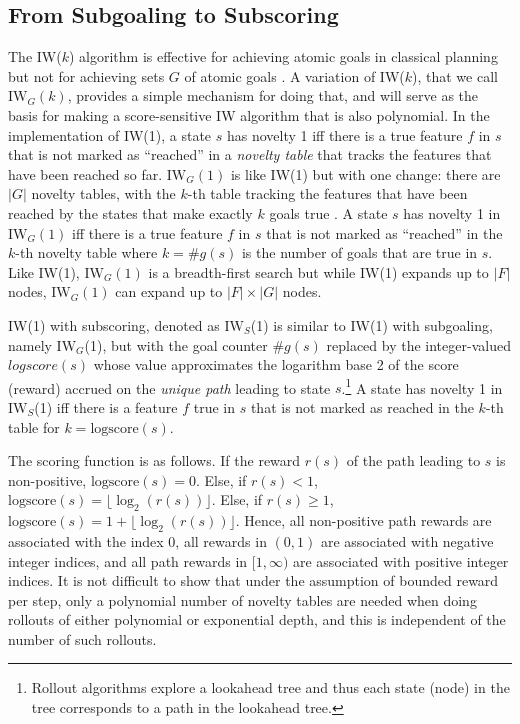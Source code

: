 \documentclass[letterpaper]{article}
\begin{document}
\subsection{From Subgoaling to Subscoring}

The IW($k$) algorithm is effective for achieving atomic goals in classical planning but
not for achieving sets $G$ of atomic goals \cite{nir:ecai2012}. A variation of IW($k$),
that we call $\textrm{IW}_G(k)$, provides a simple mechanism for doing that, and will
serve as the basis for making a score-sensitive IW algorithm that is also polynomial.
In the implementation of IW(1), a state $s$ has novelty 1 iff there is a true feature $f$
in $s$ that is not marked as ``reached''  in a \emph{novelty table} that tracks the
features that have been reached so far.
$\textrm{IW}_G(1)$ is like IW(1) but with one change: there are $|G|$ novelty tables,
with the $k$-th table tracking the features that have been reached by the states that
make exactly $k$ goals true \cite{nir:aaai2017}.
A state $s$ has novelty 1 in $\textrm{IW}_G(1)$ iff there is a true feature $f$ in $s$
that is not marked as ``reached'' in the $k$-th novelty table where  $k=\#g(s)$ is the
number of goals that are true in $s$.
Like IW(1), $\textrm{IW}_G(1)$ is a breadth-first search but while IW(1) expands up to
$|F|$ nodes,  $\textrm{IW}_G(1)$ can expand up to $|F| \times |G|$ nodes.

IW(1) with subscoring, denoted as $\textrm{IW}_S$(1) is similar to IW(1) with subgoaling,
namely $\textrm{IW}_G$(1), but with the goal counter $\#g(s)$ replaced by the integer-valued
$logscore(s)$ whose value approximates the logarithm base 2 of the score (reward) accrued
on the \emph{unique path} leading to state $s$.\footnote{Rollout algorithms explore a
  lookahead tree and thus each state (node) in the tree corresponds to a path
  in the lookahead tree.
}
A state has novelty 1 in $\textrm{IW}_S$(1) iff there is a feature $f$ true in $s$ that
is not marked as reached in the $k$-th table for $k=\text{logscore}(s)$.

The scoring function is as follows. If the reward $r(s)$ of the path leading
to $s$ is non-positive, $\text{logscore}(s)=0$.
Else, if $r(s)<1$, $\text{logscore}(s)=\lfloor\log_2(r(s))\rfloor$.
Else, if $r(s)\geq 1$, $\text{logscore}(s)=1 + \lfloor\log_2(r(s))\rfloor$.
Hence, all non-positive path rewards are associated with the index 0, all
rewards in $(0,1)$ are associated with negative integer indices, and all
path rewards in $[1,\infty)$ are associated with positive integer indices.
It is not difficult to show that under the assumption of bounded reward per
step, only a polynomial number of novelty tables are needed when doing rollouts
of either polynomial or exponential depth, and this is independent of the number
of such rollouts.
\end{document}
